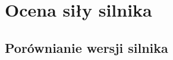 
\chapter{Ocena siły silnika}
\label{ch:ocena-sily-silnika}



\section{Porównianie wersji silnika}
\label {sec:porownanie-wersji-silnika}